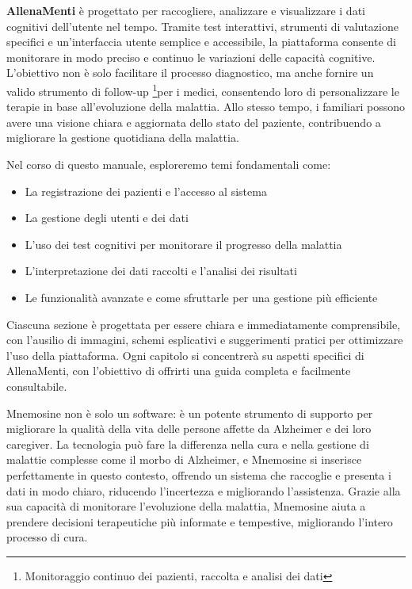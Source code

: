 \documentclass[a4paper,12pt]{book}
\begin{document}
	\textbf{AllenaMenti} è progettato per raccogliere, analizzare e visualizzare i dati cognitivi dell'utente nel tempo. Tramite test interattivi, strumenti di valutazione specifici e un’interfaccia utente semplice e accessibile, la piattaforma consente di monitorare in modo preciso e continuo le variazioni delle capacità cognitive. L’obiettivo non è solo facilitare il processo diagnostico, ma anche fornire un valido strumento di follow-up \footnote[1]{Monitoraggio continuo dei pazienti, raccolta e analisi dei dati}per i medici, consentendo loro di personalizzare le terapie in base all’evoluzione della malattia. Allo stesso tempo, i familiari possono avere una visione chiara e aggiornata dello stato del paziente, contribuendo a migliorare la gestione quotidiana della malattia.
	
	Nel corso di questo manuale, esploreremo temi fondamentali come:
	\begin{itemize}
		\item La registrazione dei pazienti e l'accesso al sistema
		\item La gestione degli utenti e dei dati
		\item L’uso dei test cognitivi per monitorare il progresso della malattia
		\item L’interpretazione dei dati raccolti e l’analisi dei risultati
		\item Le funzionalità avanzate e come sfruttarle per una gestione più efficiente
	\end{itemize}
	
	Ciascuna sezione è progettata per essere chiara e immediatamente comprensibile, con l’ausilio di immagini, schemi esplicativi e suggerimenti pratici per ottimizzare l'uso della piattaforma. Ogni capitolo si concentrerà su aspetti specifici di AllenaMenti, con l’obiettivo di offrirti una guida completa e facilmente consultabile.
	
	Mnemosine non è solo un software: è un potente strumento di supporto per migliorare la qualità della vita delle persone affette da Alzheimer e dei loro caregiver. La tecnologia può fare la differenza nella cura e nella gestione di malattie complesse come il morbo di Alzheimer, e Mnemosine si inserisce perfettamente in questo contesto, offrendo un sistema che raccoglie e presenta i dati in modo chiaro, riducendo l’incertezza e migliorando l’assistenza. Grazie alla sua capacità di monitorare l’evoluzione della malattia, Mnemosine aiuta a prendere decisioni terapeutiche più informate e tempestive, migliorando l’intero processo di cura.
	
\end{document}
